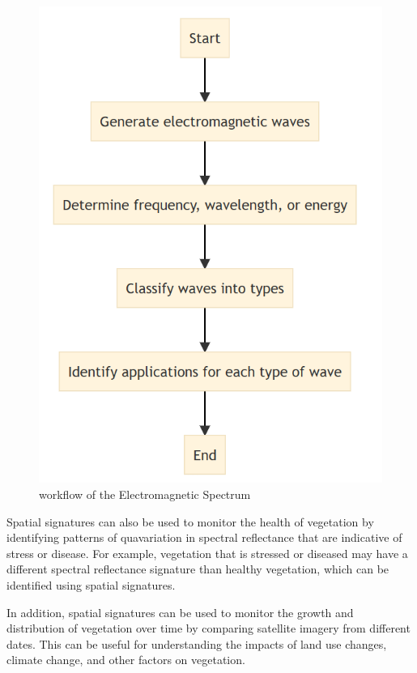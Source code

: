 \documentclass[
  letterpaper,
  DIV=11,
  numbers=noendperiod]{scrreprt}
\begin{document}
\begin{figure}

{\centering \includegraphics{./images/workflow of the Electromagnetic Spectrum.png}

}

\caption{\label{fig-wkfl}workflow of the Electromagnetic Spectrum}

\end{figure}

Spatial signatures can also be used to monitor the health of vegetation
by identifying patterns of quavariation in spectral reflectance that are
indicative of stress or disease. For example, vegetation that is
stressed or diseased may have a different spectral reflectance signature
than healthy vegetation, which can be identified using spatial
signatures.

In addition, spatial signatures can be used to monitor the growth and
distribution of vegetation over time by comparing satellite imagery from
different dates. This can be useful for understanding the impacts of
land use changes, climate change, and other factors on vegetation.
\end{document}
